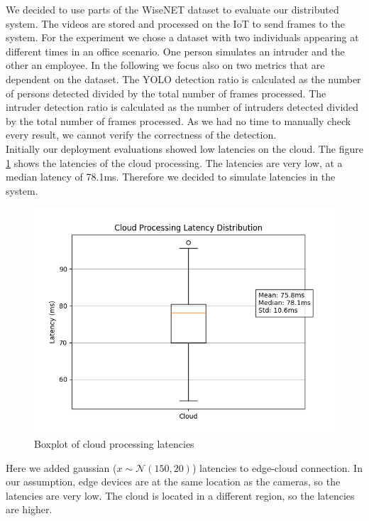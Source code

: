 \documentclass[conference]{IEEEtran}
\begin{document}
We decided to use parts of the WiseNET dataset to evaluate our distributed system. The videos are stored and processed on the IoT to send frames to the system. For the experiment we chose a dataset with two individuals appearing at different times in an office scenario.  One person simulates an intruder and the other an employee.
In the following we focus also on two metrics that are dependent on the dataset. The YOLO detection ratio is calculated as the number of persons detected divided by the total number of frames processed. The intruder detection ratio is calculated as the number of intruders detected divided by the total number of frames processed. 
As we had no time to manually check every result, we cannot verify the correctness of the detection. 
\\

Initially our deployment evaluations showed low latencies on the cloud. The figure  \ref{fig:cloud_latencies_old} shows the latencies of the cloud processing. The latencies are very low, at a median latency of 78.1ms. Therefore we decided to simulate latencies in the system. 

\begin{figure}[!h]
    \centering
    \includegraphics[width=1\linewidth]{./res/evaluation_without_latencies/cloud_latencies_old.png}
    \caption{Boxplot of cloud processing latencies}
    \label{fig:cloud_latencies_old}
\end{figure}

Here we added gaussian  ($x \sim \mathcal{N}(150, 20)$) latencies to edge-cloud connection. In our assumption, edge devices are at the same location as the cameras, so the latencies are very low. The cloud is located in a different region, so the latencies are higher. 
\hfill \break
\hfill \break
\end{document}
